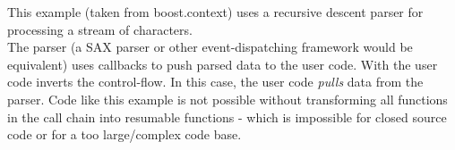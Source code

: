 \label{appendix}
This example (taken from boost.context\cite{bcontext}) uses a recursive descent
parser for processing a stream of characters.\\
The parser (a SAX parser or other event-dispatching framework would be
equivalent) uses callbacks to push parsed data to the user code. With \ectx the
user code inverts the control-flow. In this case, the user code \textit{pulls}
data from the parser.
Code like this example is not possible without transforming all functions in the
call chain into resumable functions - which is impossible for closed source code
or for a too large/complex code base.
